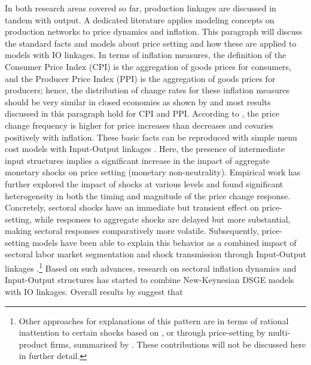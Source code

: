 In both research areas covered so far, production linkages are discussed in tandem with output. A dedicated literature applies 
modeling concepts on production networks to price dynamics and inflation. This paragraph will discuss the standard facts and models
about price setting and how these are applied to models with IO linkages. In terms of inflation measures, the definition of the 
Consumer Price Index (CPI) is the aggregation of goods prices for consumers, and the Producer Price Index (PPI) is the aggregation 
of goods prices for producers; hence, the distribution of change rates for these inflation measures should be very similar in closed 
economies as shown by \textcite{nakamura2008FiveFactsPrices} and most results discussed in this paragraph hold for CPI and PPI. 
According to \textcite{nakamura2008FiveFactsPrices}, the price change frequency is higher for price increases than decreases and 
covaries positively with inflation. These basic facts can be reproduced with simple menu cost models with Input-Output linkages 
\parencite{nakamura2010MonetaryNonneutralityMultisector}. Here, the presence of intermediate input structures implies a significant 
increase in the impact of aggregate monetary shocks on price setting (monetary non-neutrality). Empirical work has further explored 
the impact of shocks at various levels \parencite{boivin2009StickyPricesMonetary,beck2016ImportanceSectoralRegional} and found 
significant heterogeneity in both the timing and magnitude of the price change response. Concretely, sectoral shocks have an 
immediate but transient effect on price-setting, while responses to aggregate shocks are delayed but more substantial, making 
sectoral responses comparatively more volatile. Subsequently, price-setting models have been able to explain this behavior as a 
combined impact of sectoral labor market segmentation and shock transmission through Input-Output linkages 
\parencite[in circulation since 2011]{carvalho2021SectoralPriceFacts}.\footnote{Other approaches for explanations of this pattern 
are in terms of rational inattention to certain shocks based on \textcite{mackowiakOptimalStickyPrices2009}, or through 
price-setting by multi-product firms, summarised by \textcite{bhattarai2014MultiproductFirmsPricesetting}. These contributions 
will not be discussed here in further detail.} Based on such advances, research on sectoral inflation dynamics and Input-Output 
structures has started to combine New-Keynesian DSGE models with IO linkages. Overall results by 
\textcite{smets2019PipelinePressuresSectoral,afrouzi2023InflationGDPDynamics,minton2023DelayedInflationSupply} suggest that 
